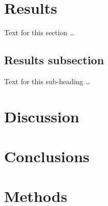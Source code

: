 \documentclass{bmcart}
\begin{document}

\section*{Results}
Text for this section \ldots
\subsection*{Results subsection}
Text for this sub-heading \ldots

\section*{Discussion}

\section*{Conclusions}

\section*{Methods}


\end{document}

